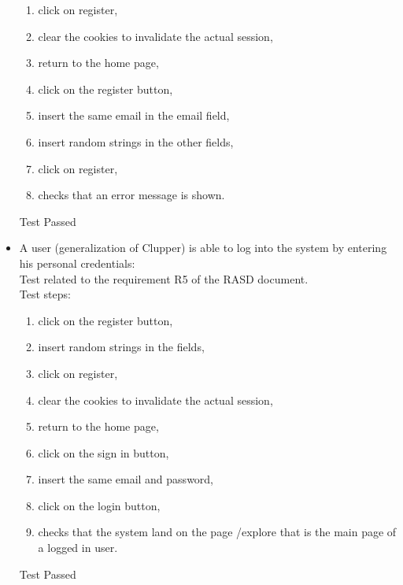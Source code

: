 \begin{itemize}
\begin{enumerate}
        \item click on register,

        \item clear the cookies to invalidate the actual session,

        \item return to the home page,

        \item click on the register button,

        \item insert the same email in the email field,

        \item insert random strings in the other fields,

        \item click on register,

        \item checks that an error message is shown.
    \end{enumerate}
    Test Passed \\

    \item A user (generalization of Clupper) is able to log into the system by entering his personal credentials: \\
    Test related to the requirement R5 of the RASD document. \\
    Test steps: \\
    \begin{enumerate}

        \item click on the register button,

        \item insert random strings in the fields,

        \item click on register,

        \item clear the cookies to invalidate the actual session,

        \item return to the home page,

        \item click on the sign in button,

        \item insert the same email and password,

        \item click on the login button,
        \item checks that the system land on the page /explore that is the main page of a logged in user.
    \end{enumerate}
    Test Passed

\end{itemize}
